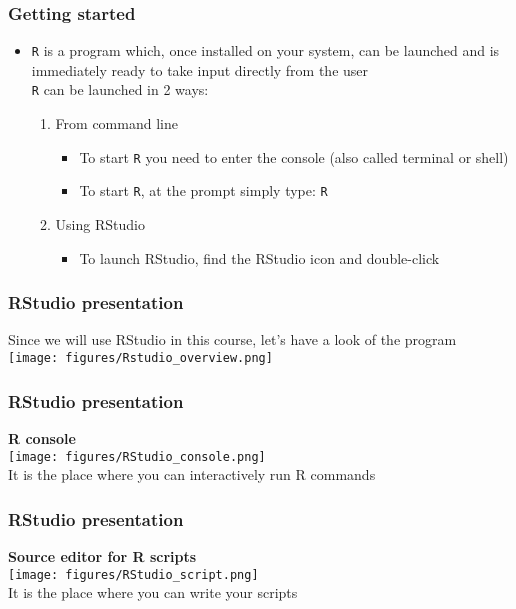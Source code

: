 \documentclass{beamer}
\begin{document}
\begin{frame}[fragile]
	\frametitle{Getting started}
        \begin{itemize}
          \item \texttt{R} is a program which, once installed on your system, can be launched and is immediately ready to take input directly from the user\\
         
  \texttt{R} can be launched in 2 ways:
	  \begin{enumerate}
	    \item From command line
	      \begin{itemize}
		\item To start \texttt{R} you need to enter the console (also called terminal or shell)
		\item To start \texttt{R}, at the prompt simply type: \Large \texttt{R}
	      \end{itemize}
	    \item Using RStudio
	      \begin{itemize}
		  \item To launch RStudio, find the RStudio icon and double-click
		\end{itemize}
	    \end{enumerate}
  \end{itemize}
\end{frame}

\begin{frame}
	\frametitle{RStudio presentation}
	Since we will use RStudio in this course, let's have a look of the program\\
	\centering \texttt{[image: figures/Rstudio\_overview.png]}
\end{frame}

\begin{frame}
	\frametitle{RStudio presentation}
	\textbf{R console}\\
	\vspace{20pt}
	\centering \texttt{[image: figures/RStudio\_console.png]}\\
	\small It is the place where you can interactively run R commands
\end{frame}

\begin{frame}
	\frametitle{RStudio presentation}
	\textbf{Source editor for R scripts}\\
	\vspace{20pt}
	\centering \texttt{[image: figures/RStudio\_script.png]}\\
	\small It is the place where you can write your scripts
\end{frame}
\end{document}
